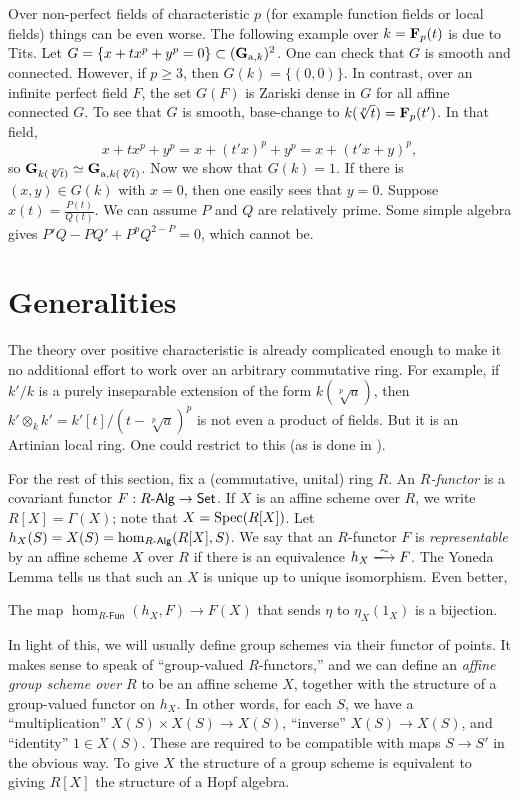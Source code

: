 \documentclass{article}
\begin{document}
Over non-perfect fields of characteristic $p$ (for example function fields or 
local fields) things can be even worse. The following example over 
$k=\mathbf{F}_p(t)$ is due to Tits. Let 
$G=\{x+t x^p+y^p=0\}\subset (\mathbf{G}_{\mathrm{a},k})^2$. One can check that $G$ is 
smooth and connected. However, if $p\geqslant 3$, then 
$G(k)=\{(0,0)\}$. In contrast, over an infinite perfect field $F$, the set 
$G(F)$ is Zariski dense in $G$ for all affine connected $G$. To see that 
$G$ is smooth, base-change to $k(\sqrt[p] t)=\mathbf{F}_p(t')$. In that field, 
\[
  x+t x^p+y^p = x+(t'x)^p + y^p = x+(t'x+y)^p ,
\]
so $\mathbf{G}_{k(\sqrt[p] t)}\simeq \mathbf{G}_{\mathrm{a},k(\sqrt[p] t)}$. Now we show 
that $G(k)=1$. If there is $(x,y)\in G(k)$ with $x=0$, then one easily sees 
that $y=0$. Suppose $x(t)=\frac{P(t)}{Q(t)}$. We can assume $P$ and $Q$ are 
relatively prime. Some simple algebra gives $P' Q-P Q' + P^p Q^{2-P} = 0$, 
which cannot be. 





\section{Generalities}

The theory over positive characteristic is already complicated enough to make 
it no additional effort to work over an arbitrary commutative ring. For 
example, if $k'/k$ is a purely inseparable extension of the form 
$k(\sqrt[p] a)$, then $k'\otimes_k k' = k'[t]/(t-\sqrt[p] a)^p$ is not even 
a product of fields. But it is an Artinian local ring. One could restrict to 
this (as is done in \cite[VIa]{sga3}). 

For the rest of this section, fix a (commutative, unital) ring $R$. An 
\emph{$R$-functor} is a covariant functor 
$F:R\text{-}\mathsf{Alg}\to \mathsf{Set}$. If $X$ is an affine scheme over $R$, we write 
$R[X]=\Gamma(X)$; note that $X=\operatorname{Spec}(R[X])$. Let 
$h_X(S)=X(S)=\hom_{R\text{-}\mathsf{Alg}}(R[X],S)$. We say that an $R$-functor $F$ is 
\emph{representable} by an affine scheme $X$ over $R$ if there is an 
equivalence $h_X \isomorphism F$. The Yoneda Lemma tells us that such an $X$ is 
unique up to unique isomorphism. Even better, 

\begin{lemma}[Yoneda]
The map $\hom_{R\text{-}\mathsf{Fun}}(h_X,F) \to F(X)$ that sends 
$\eta$ to $\eta_X(1_X)$ is a bijection. 
\end{lemma}

In light of this, we will usually define group schemes via their functor of 
points. It makes sense to speak of ``group-valued $R$-functors,'' and we can 
define an \emph{affine group scheme over $R$} to be an affine scheme $X$, 
together with the structure of a group-valued functor on $h_X$. In other words, 
for each $S$, we have a ``multiplication'' $X(S)\times X(S) \to X(S)$, 
``inverse'' $X(S) \to X(S)$, and ``identity'' $1\in X(S)$. These are required 
to be compatible with maps $S\to S'$ in the obvious way. To give $X$ the 
structure of a group scheme is equivalent to giving $R[X]$ the structure of a 
Hopf algebra. 
\end{document}
